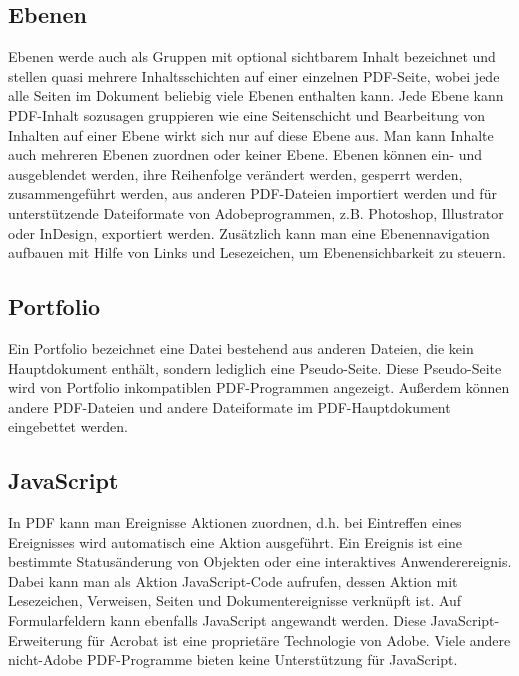 \subsection{Ebenen}
Ebenen werde auch als Gruppen mit optional sichtbarem Inhalt bezeichnet und stellen quasi mehrere Inhaltsschichten auf einer einzelnen PDF-Seite, wobei jede alle Seiten im Dokument beliebig viele Ebenen enthalten kann. Jede Ebene kann PDF-Inhalt sozusagen gruppieren wie eine Seitenschicht und Bearbeitung von Inhalten auf einer Ebene wirkt sich nur auf diese Ebene aus. Man kann Inhalte auch mehreren Ebenen zuordnen oder keiner Ebene. Ebenen können ein- und ausgeblendet werden, ihre Reihenfolge verändert werden, gesperrt werden, zusammengeführt werden, aus anderen PDF-Dateien importiert werden und für unterstützende Dateiformate von Adobeprogrammen, z.B. Photoshop, Illustrator oder InDesign, exportiert werden. Zusätzlich kann man eine Ebenennavigation aufbauen mit Hilfe von Links und Lesezeichen, um Ebenensichbarkeit zu steuern. \cite{adobe-ebenen}

\subsection{Portfolio}
Ein Portfolio bezeichnet eine Datei bestehend aus anderen Dateien, die kein Hauptdokument enthält, sondern lediglich eine Pseudo-Seite. Diese Pseudo-Seite wird von Portfolio inkompatiblen PDF-Programmen angezeigt. Außerdem können andere PDF-Dateien und andere Dateiformate im PDF-Hauptdokument eingebettet werden. \cite{softx}

\subsection{JavaScript}
In PDF kann man Ereignisse Aktionen zuordnen, d.h. bei Eintreffen eines Ereignisses wird automatisch eine Aktion ausgeführt. Ein Ereignis ist eine bestimmte Statusänderung von Objekten oder eine interaktives Anwenderereignis. Dabei kann man als Aktion JavaScript-Code aufrufen, dessen Aktion mit Lesezeichen, Verweisen, Seiten und Dokumentereignisse verknüpft ist. Auf Formularfeldern kann ebenfalls JavaScript angewandt werden. \cite{softx} Diese JavaScript-Erweiterung für Acrobat ist eine proprietäre Technologie von Adobe. Viele andere nicht-Adobe PDF-Programme bieten keine Unterstützung für JavaScript. \cite{wiki-pdf-engl}